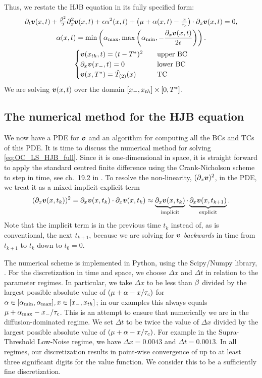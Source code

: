 Thus, we restate the HJB equation in its fully specified form:
\begin{equation}
\begin{gathered}
{\partial}_t { \boldsymbol{v} }(x,t) + \tfrac{\beta^2}{2} {\partial}_x^2{ \boldsymbol{v} }(x,t)+
{\epsilon} \alpha^2(x,t) + \big({\mu } + \alpha(x,t) -\tfrac{x}{\tau_c}\big)\cdot {\partial}_x{ \boldsymbol{v} }(x,t)
= 0,
\\
\alpha (x,t) = \min \left({ \alpha_{\textrm{max}} }, \max\left({ \alpha_{\textrm{min}} }, -\frac{{\partial}_x { \boldsymbol{v} }(x,t)}{2{\epsilon}}\right)
\right).
\\
\begin{cases}
{ \boldsymbol{v} }({ x_{th} },t) = (t-{ T^* })^2  \quad & \textrm{upper BC}
\\
{\partial}_x { \boldsymbol{v} }({ x_{-} }, t)  = 0  \quad &\textrm{lower BC}
\\
{ \boldsymbol{v} }(x,{ T^* })  =
{ \hat{T}_{(2)} }(x)
\,& \textrm{TC}
\end{cases}
\end{gathered}
\label{eq:OC_LS_HJB_full}
\end{equation}
We are solving ${ \boldsymbol{v} }(x,t)$ over the domain $[{ x_{-} }, { x_{th} }] \times [0,{ T^* }]$.

\subsection{The numerical method for the HJB equation}
\label{sec:hjb_numerix}
We now have a PDE for ${ \boldsymbol{v} }$ and an algorithm for computing all the BCs and TCs of
this PDE. It is time to discuss the numerical method for solving
\cref{eq:OC_LS_HJB_full}. Since it is one-dimensional in space, it is straight
forward to apply the standard centred finite difference using the
Crank-Nicholson scheme to step in time, see ch.\ 19.2 in \cite{Press1992}. To
resolve the non-linearity, $({\partial}_x{ \boldsymbol{v} })^2$, in the PDE, we treat it as a mixed
implicit-explicit term $$({\partial}_x { \boldsymbol{v} }(x,t_k))^2 = {\partial}_x { \boldsymbol{v} }(x,t_k) \cdot {\partial}_x
{ \boldsymbol{v} }(x,t_k) \approx \underbrace{{\partial}_x { \boldsymbol{v} }(x,t_k)}_{\textrm{implicit}} \cdot
\underbrace{{\partial}_x{ \boldsymbol{v} }(x,t_{k+1})}_{\textrm{explicit}}.$$ Note that the implicit
term is in the previous time $t_k$ instead of, as is conventional, the next
$t_{k+1}$, because we are solving for ${ \boldsymbol{v} }$ {\sl backwards} in time from
$t_{k+1}$ to $t_k$ down to  $t_0 = 0$.

The numerical scheme is implemented in Python, using the Scipy/Numpy library,
\cite{Scipy}. For the discretization in time and space, we choose $\Delta x$ and
$\Delta t$ in relation to the parameter regimes. In particular, we take $\Delta
x$ to be less than $\beta$ divided by the largest possible absolute value of $({\mu } +
\alpha - x/\tau_c)$ for $\alpha \in [{ \alpha_{\textrm{min}} }, { \alpha_{\textrm{max}} }], x \in [{ x_{-} }, { x_{th} }]$; in our examples
this always equals $\mu + { \alpha_{\textrm{max}} } - { x_{-} }/\tau_c$. This is an attempt to ensure
that numerically we are in the diffusion-dominated regime. We set $\Delta t$ to
be twice the value of $\Delta x$ divided by the largest possible absolute
value of $({\mu } + \alpha - x/\tau_c)$. For example in the Supra-Threshold Low-Noise regime, we
have $\Delta x = 0.0043$ and $\Delta t = 0.0013$. In all regimes, our
discretization results in point-wise convergence of up to at least three
significant digits for the value function. We consider this to be a sufficiently
fine discretization. 

